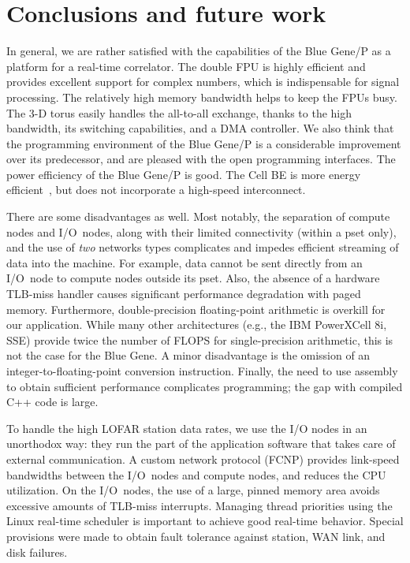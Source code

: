 \documentclass{sig-alternate}
\begin{document}
\section{Conclusions and future work}
\label{sec:conclusions}

In general, we are rather satisfied with the capabilities of the Blue Gene/P
as a platform for a real-time correlator.
The double FPU is highly efficient and provides excellent support for complex
numbers, which is indispensable for signal processing.
The relatively high memory bandwidth helps to keep the FPUs busy.
The 3-D torus easily handles the all-to-all exchange, thanks to the high
bandwidth, its switching capabilities, and a DMA controller.
We also think that the programming environment of the Blue Gene/P is a
considerable improvement over its predecessor,
and are pleased with the open programming interfaces.
The power efficiency of the Blue Gene/P is good.
The Cell BE is more energy efficient~\cite{Nieuwpoort:09}, but does not
incorporate a high-speed interconnect.

There are some disadvantages as well.
Most notably, the separation of compute nodes and I/O~nodes, along with their
limited connectivity (within a pset only), and the use of \emph{two\/}
networks types complicates and impedes efficient streaming of data into the
machine.
For example, data cannot be sent directly from an I/O~node to 
compute nodes outside its pset.
Also, the absence of a hardware TLB-miss handler causes significant
performance degradation with paged memory.
Furthermore, double-precision floating-point arithmetic is overkill for our
application.
While many other architectures (e.g., the IBM PowerXCell 8i, SSE) provide twice
the number of FLOPS for single-precision arithmetic, this is not the case for
the Blue Gene.
A minor disadvantage is the omission of an integer-to-floating-point conversion
instruction.
Finally, the need to use assembly to obtain sufficient performance complicates
programming; the gap with compiled C++ code is large.

To handle the high LOFAR station data rates, we use the I/O nodes in an
unorthodox way: they run the part of the application software that takes care
of external communication.
A custom network protocol (FCNP) provides link-speed bandwidths between the
I/O~nodes and compute nodes, and reduces the CPU utilization.
On the I/O~nodes, the use of a large, pinned memory area avoids excessive
amounts of TLB-miss interrupts.
Managing thread priorities using the Linux real-time scheduler is important to 
achieve good real-time behavior.
Special provisions were made to obtain fault tolerance against
station, WAN link, and disk failures.
\end{document}
